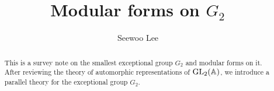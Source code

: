 \documentclass[letterpaper, 12pt]{article}
\begin{document}

\title{Modular forms on $G_2$}


\author{Seewoo Lee}
\date{}


\maketitle



\begin{abstract}
    This is a survey note on the smallest exceptional group $G_2$ and modular forms on it.
    After reviewing the theory of automorphic representations of $\mathrm{GL}_2(\mathbb{A})$, we introduce a parallel theory for the exceptional group $G_2$.
\end{abstract}

% 







\newpage
















\end{document}
